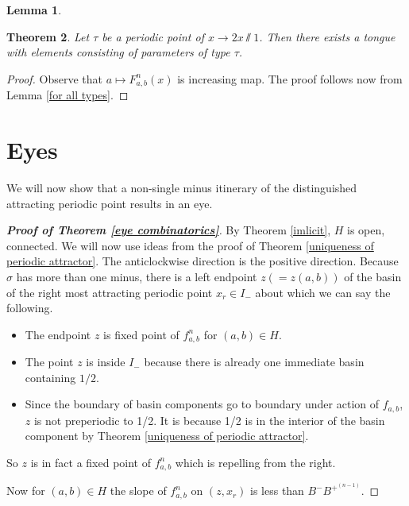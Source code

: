 \documentclass[12pt]{amsart}
\numberwithin{equation}{section}
\newtheorem{theorem}{Theorem}[section]
\newtheorem{lemma}[theorem]{Lemma}
\theoremstyle{remark}
\begin{document}
{\begin{lemma}
\end{lemma}


\begin{theorem}
    Let $\tau$ be a periodic point of $x \to 2x \sslash 1$. Then there exists a tongue with elements consisting of parameters of type $\tau$.
\end{theorem}
\begin{proof}
Observe that $a \mapsto F^{n}_{a,b}(x)$ is increasing map. The proof follows now from Lemma \ref{for all types}.
\end{proof}



\section{Eyes}\label{eye}

We will now show that a non-single minus itinerary of the distinguished attracting periodic point results in an eye.




\begin{proof}[\textbf{Proof of Theorem \ref{eye combinatorics}}]
    By Theorem \ref{imlicit}, $H$ is open, connected. We will now use ideas from the proof of Theorem \ref{uniqueness of periodic attractor}. The anticlockwise direction is the positive direction. Because $\sigma$ has more than one minus, there is a left endpoint $z(=z(a,b))$  of the basin of the right most attracting periodic point $x_r\in I_-$ about which we can say the following.
    \begin{itemize}
        \item The endpoint $z$ is fixed point of $f_{a,b}^n$ for $(a,b) \in H$.
        \item The point $z$ is inside $I_-$ because there is already one immediate basin containing $1/2$.
        \item Since the boundary of basin components go to boundary under action of $f_{a,b}$, $z$ is  not preperiodic to 1/2. It is  because 1/2 is in the interior of the basin component by Theorem \ref{uniqueness of periodic attractor}. 
    \end{itemize}
    
    
    
    
      So $z$ is in fact a fixed point of $f_{a,b}^n$ which is repelling from the right.
     
    
    Now  for  $(a,b) \in H$  the slope of $f_{a,b}^n$ on $(z,x_r)$ is less than $B^-B^{+^{(n-1)}}$. 
     

\end{proof}}
\end{document}
